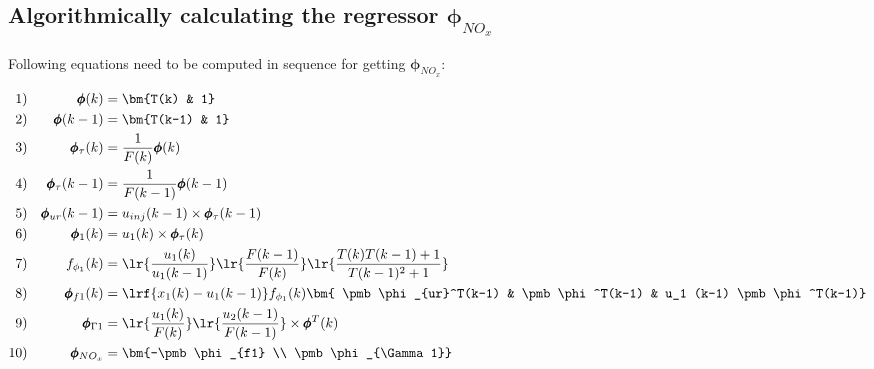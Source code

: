 \subsection{Algorithmically calculating the regressor $\pmb \phi_{NO_x}$}

Following equations need to be computed in sequence for getting $\pmb \phi_{NO_x}$:


\begin{align*}
        1)&& \pmb \phi(k) &= \bm{T(k) & 1}\\
        2)&& \pmb \phi(k-1) &= \bm{T(k-1) & 1} \\
        3)&& \pmb \phi_\tau(k) &= \frac{1}{F(k)} \pmb \phi(k)\\
        4)&& \pmb \phi_\tau(k-1)&= \frac{1}{F(k-1)} \pmb \phi(k-1)\\
        5)&& \pmb \phi_{ur}(k-1)&= u_{inj}(k-1) \times \pmb \phi_\tau (k-1) \\
        6)&& \pmb \phi_1(k) &= u_1(k) \times \pmb \phi_\tau(k)\\
        7)&& f_{\phi_1}(k) &= \lr{\frac{u_1(k)}{u_1(k-1)}}
                                \lr{\frac{F(k-1)}{F(k)}}
                                        \lr{\frac{T(k)T(k-1) + 1}{T(k-1)^2 + 1}}\\
        8)&& \pmb \phi_{f1}(k) &= \lrf{{x_1(k) - u_1(k-1)}} f_{\phi_1}(k)
                                \bm{ \pmb \phi_{ur}^T(k-1) &
                                    \pmb \phi^T(k-1)  &
                                    u_1 (k-1) \pmb \phi^T(k-1)}   \\
        9)&& \pmb \phi_{\Gamma 1} &= \lr{\frac{u_1(k)}{F(k)}} \lr{\frac{u_2(k-1)}{F(k-1)}} \times \pmb \phi^T(k) \\
        10)&& \pmb \phi_{NO_x} &= \bm{-\pmb \phi_{f1} \\ \pmb \phi_{\Gamma 1}}
\end{align*}
